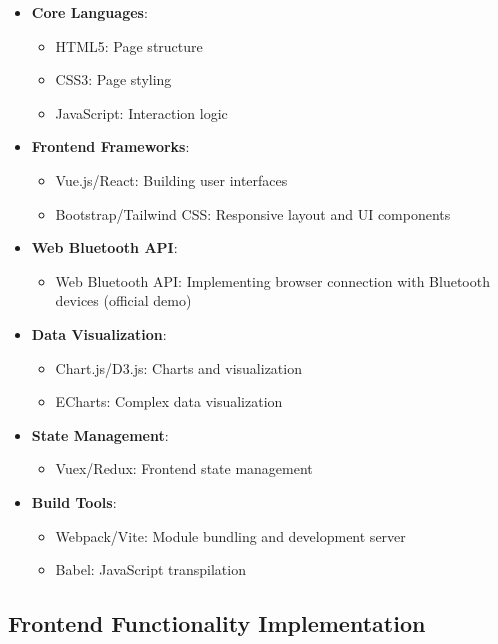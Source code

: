 \documentclass[a4paper,12pt]{article}
\begin{document}
\begin{itemize}
  \item \textbf{Core Languages}:
    \begin{itemize}
      \item HTML5: Page structure
      \item CSS3: Page styling
      \item JavaScript: Interaction logic
    \end{itemize}
  
  \item \textbf{Frontend Frameworks}:
    \begin{itemize}
      \item Vue.js/React: Building user interfaces
      \item Bootstrap/Tailwind CSS: Responsive layout and UI components
    \end{itemize}
  
  \item \textbf{Web Bluetooth API}:
    \begin{itemize}
      \item Web Bluetooth API: Implementing browser connection with Bluetooth devices (official demo)
    \end{itemize}
  
  \item \textbf{Data Visualization}:
    \begin{itemize}
      \item Chart.js/D3.js: Charts and visualization
      \item ECharts: Complex data visualization
    \end{itemize}
  
  \item \textbf{State Management}:
    \begin{itemize}
      \item Vuex/Redux: Frontend state management
    \end{itemize}
  
  \item \textbf{Build Tools}:
    \begin{itemize}
      \item Webpack/Vite: Module bundling and development server
      \item Babel: JavaScript transpilation
    \end{itemize}
\end{itemize}

\subsection{Frontend Functionality Implementation}
\end{document}
